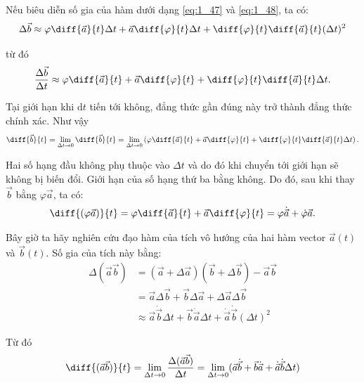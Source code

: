 \noindent
Nếu biêu diễn số gia của hàm dưới dạng \eqref{eq:1_47} và \eqref{eq:1_48}, ta có:
\begin{equation*}
\Delta\vec{b} \approx \varphi\diff{\vec{a}}{t}\Delta t + \vec{a}\diff{\varphi}{t}\Delta t + \diff{\varphi}{t}\diff{\vec{a}}{t}(\Delta t)^2
\end{equation*}

\noindent
từ đó
\begin{equation*}
\frac{\Delta\vec{b}}{\Delta t} \approx \varphi\diff{\vec{a}}{t} + \vec{a}\diff{\varphi}{t} + \diff{\varphi}{t}\diff{\vec{a}}{t}\Delta t.
\end{equation*}

\noindent
Tại giới hạn khi $\mathrm{d}t$ tiến tới không, đẳng thức gần đúng này trở thành đẳng thức chính xác. Như vậy
\begin{equation*}
\diff{\vec{b}}{t} = \lim_{\Delta t\to 0} \diff{\vec{b}}{t} =  \lim_{\Delta t\to 0} \left(\varphi\diff{\vec{a}}{t} + \vec{a}\diff{\varphi}{t} + \diff{\varphi}{t} \diff{\vec{a}}{t}\Delta t\right).
\end{equation*}

\noindent
Hai số hạng đầu không phụ thuộc vào $\Delta t$ và do đó khi chuyển tới giới hạn sẽ không bị biến đổi. Giới hạn của số hạng thứ ba bằng không. Do đó, sau khi thay $\vec{b}$ bằng $\varphi\vec{a}$, ta có:
\begin{equation}\label{eq:1_49}
\diff{(\varphi\vec{a})}{t} = \varphi\diff{\vec{a}}{t} + \vec{a}\diff{\varphi}{t} = \varphi\dot{\vec{a}}+\dot{\varphi}\vec{a}.
\end{equation}

Bây giờ ta hãy nghiên cứu đạo hàm của tích vô hướng của hai hàm vector $\vec{a}(t)$ và $\vec{b}(t)$. Số gia của tích này bằng:
\begin{align*}
\Delta(\vec{a}\vec{b}) &= (\vec{a} + \Delta\vec{a})(\vec{b} + \Delta\vec{b}) - \vec{a}\vec{b}\\
&= \vec{a}\Delta\vec{b} + \vec{b}\Delta\vec{a} + \Delta\vec{a}\Delta\vec{b} \\
&\approx \vec{a}\dot{\vec{b}}\Delta t + \vec{b}\dot{\vec{a}}\Delta t + \dot{\vec{a}}\dot{\vec{b}}(\Delta t)^2
\end{align*}

\noindent
Từ đó
\begin{equation*}
\diff{(\vec{a}\vec{b})}{t} = \lim_{\Delta t\to 0} \frac{\Delta(\vec{a}\vec{b})}{\Delta t} = \lim_{\Delta t\to 0} (\vec{a}\dot{\vec{b}} + \vec{b}\dot{\vec{a}} + \dot{\vec{a}}\dot{\vec{b}}\Delta t)
\end{equation*}

